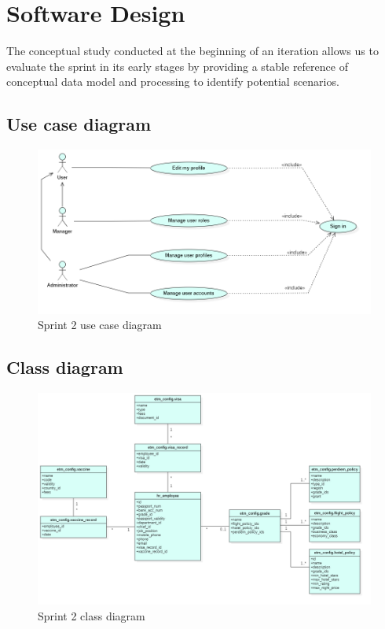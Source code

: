 \section{Software Design}
The conceptual study conducted at the beginning of an iteration allows us to evaluate the sprint in its early stages by providing a stable reference of conceptual data model and processing to identify potential scenarios.

        \subsection{Use case diagram}
    \begin{figure}[H]
    \begin{center}
        \includegraphics[scale=0.4]{img/sprint2_usecase.png}
        \caption{Sprint 2 use case diagram}
    \end{center}
     \label{fig:my_label}
\end{figure}

    \subsection{Class diagram}
        \begin{figure}[H]
    \begin{center}
        \includegraphics[scale=0.42]{img/sprint2_class.png}
        \caption{Sprint 2 class diagram}
    \end{center}
     \label{fig:my_label}
\end{figure}
        

